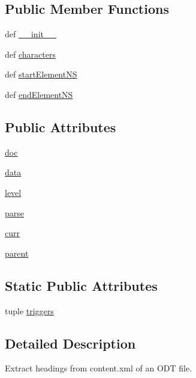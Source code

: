 \subsection*{Public Member Functions}
\begin{DoxyCompactItemize}
\item 
def \hyperlink{classodf_1_1load_1_1LoadParser_af562bc969ae0ecfbc857003d21dd0eea}{\+\_\+\+\_\+init\+\_\+\+\_\+}
\item 
def \hyperlink{classodf_1_1load_1_1LoadParser_a590fb2686031602e2e4786e05347fd57}{characters}
\item 
def \hyperlink{classodf_1_1load_1_1LoadParser_a4e904dc602a70c605aa1b443bb213c5d}{start\+Element\+N\+S}
\item 
def \hyperlink{classodf_1_1load_1_1LoadParser_aa6d114eddf92d0c7149d321f6bdc32c0}{end\+Element\+N\+S}
\end{DoxyCompactItemize}
\subsection*{Public Attributes}
\begin{DoxyCompactItemize}
\item 
\hyperlink{classodf_1_1load_1_1LoadParser_a7632565ea853c7ddda9a2949828e2c6f}{doc}
\item 
\hyperlink{classodf_1_1load_1_1LoadParser_acf0c06cda63675be9d1617cff5481d5e}{data}
\item 
\hyperlink{classodf_1_1load_1_1LoadParser_a407086480f544ae60a841568101b64a9}{level}
\item 
\hyperlink{classodf_1_1load_1_1LoadParser_a668b4b320572d932c8a28912e2475421}{parse}
\item 
\hyperlink{classodf_1_1load_1_1LoadParser_aa3482f0de731620689b5d43ca30a3883}{curr}
\item 
\hyperlink{classodf_1_1load_1_1LoadParser_ac94c031eca2434f2b57ad6c2e8367d70}{parent}
\end{DoxyCompactItemize}
\subsection*{Static Public Attributes}
\begin{DoxyCompactItemize}
\item 
tuple \hyperlink{classodf_1_1load_1_1LoadParser_aca293bdcaeb301d095bee36245246d2a}{triggers}
\end{DoxyCompactItemize}


\subsection{Detailed Description}
Extract headings from content.\+xml of an O\+D\+T file. 

